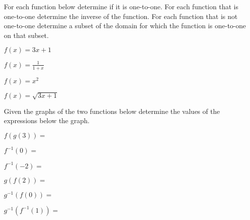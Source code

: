\begin{problem}
\item For each function below determine if it is one-to-one. For each
  function that is one-to-one determine the inverse of the
  function. For each function that is not one-to-one determine a
  subset of the domain for which the function is one-to-one on that
  subset. 
  \begin{subproblem}
    \item $f(x)=3x+1$
      \vfill
    \item $f(x)=\frac{1}{1+x}$
      \vfill
    \item $f(x)=x^2$
      \vfill
    \item $f(x)=\sqrt{3x+1}$
      \vfill
  \end{subproblem}

  \clearpage

\item Given the graphs of the two functions below determine the values
  of the expressions below the graph.

  \hspace*{-6em}
  \scalebox{0.95}{}

  \begin{subproblem}
    \item $f(g(3)) =$
      \vfill
    \item $f^{-1}(0) =$
      \vfill
    \item $f^{-1}(-2) = $
      \vfill
    \item $g(f(2)) = $
      \vfill
    \item $g^{-1}(f(0)) = $
      \vfill
    \item $g^{-1}(f^{-1}(1)) = $
      \vfill
  \end{subproblem}

\clearpage

\item 

\end{problem}

\postClass

